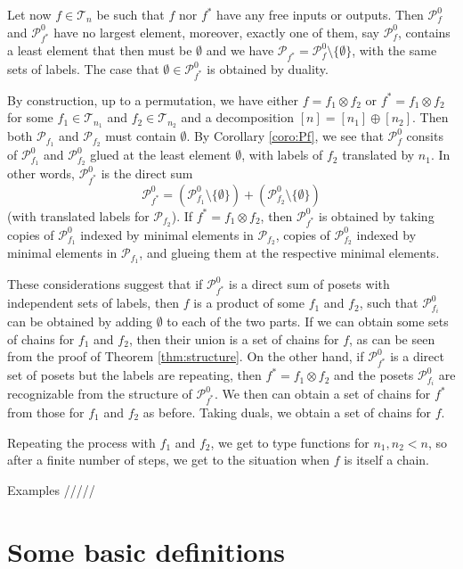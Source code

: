\documentclass[12pt]{article}
\theoremstyle{definition}
\theoremstyle{remark}
\def\Te{\mathcal T}
\def\Pe{\mathcal P}
\begin{document}
Let now $f\in \Te_n$ be such that $f$ nor $f^*$ have any free inputs or outputs. Then
$\Pe_f^0$ and $\Pe_{f^*}^0$ have no largest element, moreover, exactly one of them, say
$\Pe_f^0$, contains a least element that then must be $\emptyset$ and  we have 
$\Pe_{f^*}=\Pe_f^0\setminus \{\emptyset\}$, with the same sets of labels. The case that $\emptyset \in \Pe_{f^*}^0$ is
obtained by duality.


By construction, up to a permutation, we have either $f=f_1\otimes f_2$ or $f^*=f_1\otimes f_2$ for some
$f_1\in \Te_{n_1}$ and $f_2\in \Te_{n_2}$ and a decomposition $[n]=[n_1]\oplus[n_2]$. Then both $\Pe_{f_1}$ and $\Pe_{f_2}$ must
contain $\emptyset$. By Corollary \ref{coro:Pf}, we see that  $\Pe_f^0$ consits of
$\Pe_{f_1}^0$ and $\Pe_{f_2}^0$ glued at the least element $\emptyset$, with labels of
$f_2$ translated by $n_1$. In other words, $\Pe_{f^*}^0$ is the direct sum 
\[
\Pe_{f^*}^0=(\Pe_{f_1}^0\setminus
\{\emptyset\}) + (\Pe^0_{f_2}\setminus \{\emptyset\})
\]
(with translated labels for $\Pe_{f_2}$). 
If $f^*=f_1\otimes f_2$, then $\Pe_{f^*}^0$ is obtained by taking copies of $\Pe^0_{f_1}$
indexed by minimal elements in $\Pe_{f_2}$, copies of $\Pe^0_{f_2}$ indexed by minimal
elements in $\Pe_{f_1}$, and glueing them at the respective minimal elements. 

These
considerations suggest that if $\Pe_{f^*}^0$ is a direct sum of posets with independent
sets of labels, then $f$ is a product of some $f_1$ and $f_2$, such that $\Pe_{f_i}^0$ can
be obtained by adding $\emptyset$ to each of the two parts. If we can obtain some sets of
chains for $f_1$ and $f_2$, then their union is a set of chains for $f$, as can be seen from the proof of Theorem
\ref{thm:structure}. 
 On the other
hand, if $\Pe_{f^*}^0$ is a direct set of posets but the labels are repeating, then
$f^*=f_1\otimes f_2$ and the posets $\Pe_{f_i}^0$ are recognizable from the structure of
$\Pe_{f^*}^0$. We then can obtain a set of chains for $f^*$ from those for $f_1$ and $f_2$
as before. Taking duals, we obtain a set of chains for $f$. 

Repeating the process with $f_1$ and $f_2$, we get to type functions for $n_1,n_2<n$, so
after a finite number of steps, we get to the situation when $f$ is itself a chain.


Examples
/////



\appendix


\section{Some basic definitions}
\end{document}
